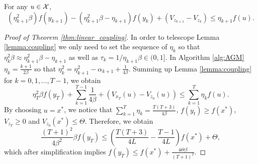 \begin{lemma}[Coupling]\label{lemma:coupling} For any $u\in\mathcal{X}$,
    \[
        \left(\eta_{k+1}^2 \beta \right) f(y_{k+1}) - \left( \eta^2_{k+1} \beta - \eta_{k+1}\right)f(y_k) + \left( V_{z_{k+1}} - V_{z_k}\right) \leq \eta_{k+1} f(u).
    \]
\end{lemma}

\begin{proof}[Proof of Theorem \ref{thm:linear_coupling}]
    In order to telescope Lemma \ref{lemma:coupling} we only need to set the sequence of $\eta_k$ so that $\eta_k^2 \beta \approx \eta_{k+1}^2 \beta - \eta_{k+1}$ as well as $\tau_k = 1/\eta_{k+1}\beta \in (0, 1]$. In Algorithm \ref{alg:AGM} $\eta_k =  \frac{k+1}{2\beta}$ so that $\eta_k^2 = \eta^2_{k+1} -\alpha_{k+1} + \frac{1}{4\beta}$. Summing up Lemma \ref{lemma:coupling} for $k = 0, 1, \dots, T-1$, we obtain
\[
    \eta^2_T \beta f(y_T) + \sum_{k=1}^{T-1}\frac{1}{4\beta} + \left( V_{x_T}(u) - V_{z_0}(u)\right) \leq   \sum_{k=1}^T \eta_k f(u).
\]
By choosing $u= x^\ast$, we notice that $\sum_{k=1}^T \eta_k = \frac{T(T+3)}{4\beta}$, $f(y_t) \geq f(x^\ast)$, $V_{z_T} \geq 0$ and $V_{z_0} (x^\ast) \leq \Theta$. Therefore, we obtain
\[
    \frac{(T+1)^2}{4\beta^2}\beta f(y_T) \leq \left(  \frac{T(T+3)}{4L} - \frac{T-1}{4L}\right)f(x^\ast) + \Theta,
\]
which after simplification implies $f(y_T)\leq f(x^\ast) + \frac{4\Theta \beta}{(T+1)^2}$.
\end{proof}


